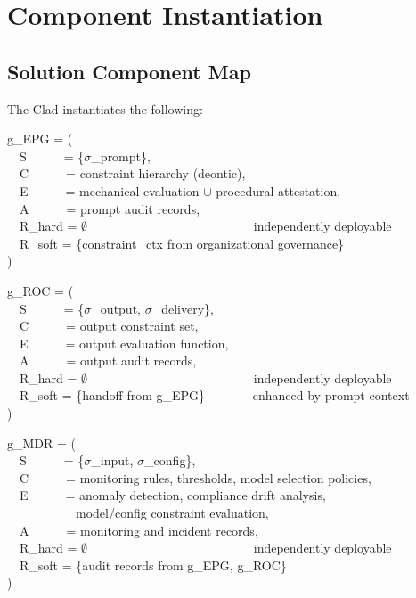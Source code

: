 \section{Component Instantiation}
\label{sec:framework-11}


\subsection{Solution Component Map}


\begin{cdef}
The Clad instantiates the following:

\begin{cladnote}
g\_EPG = (\\
~~S~~~~~~= \{$\sigma$\_prompt\},\\
~~C~~~~~~= constraint hierarchy (deontic),\\
~~E~~~~~~= mechanical evaluation $\cup$ procedural attestation,\\
~~A~~~~~~= prompt audit records,\\
~~R\_hard = $\emptyset$~~~~~~~~~~~~~~~~~~~~~~~~~~\textemdash{} independently deployable\\
~~R\_soft = \{constraint\_ctx from organizational governance\}\\
)\\
\end{cladnote}
\begin{cladnote}
g\_ROC = (\\
~~S~~~~~~= \{$\sigma$\_output, $\sigma$\_delivery\},\\
~~C~~~~~~= output constraint set,\\
~~E~~~~~~= output evaluation function,\\
~~A~~~~~~= output audit records,\\
~~R\_hard = $\emptyset$~~~~~~~~~~~~~~~~~~~~~~~~~~\textemdash{} independently deployable\\
~~R\_soft = \{handoff from g\_EPG\}~~~~~~~\textemdash{} enhanced by prompt context\\
)\\
\end{cladnote}
\begin{cladnote}
g\_MDR = (\\
~~S~~~~~~= \{$\sigma$\_input, $\sigma$\_config\},\\
~~C~~~~~~= monitoring rules, thresholds, model selection policies,\\
~~E~~~~~~= anomaly detection, compliance drift analysis,\\
~~~~~~~~~~~model/config constraint evaluation,\\
~~A~~~~~~= monitoring and incident records,\\
~~R\_hard = $\emptyset$~~~~~~~~~~~~~~~~~~~~~~~~~~\textemdash{} independently deployable\\
~~R\_soft = \{audit records from g\_EPG, g\_ROC\}\\
)\\
\end{cladnote}
\end{cdef}



